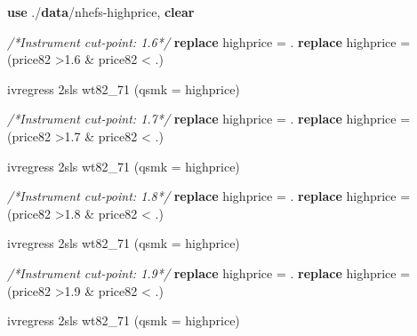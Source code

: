 \documentclass[
  10pt,
]{book}
\newenvironment{Shaded}{\begin{snugshade}}{\end{snugshade}}
\newcommand{\CommentTok}[1]{\textcolor[rgb]{0.56,0.35,0.01}{\textit{#1}}}
\newcommand{\KeywordTok}[1]{\textcolor[rgb]{0.13,0.29,0.53}{\textbf{#1}}}
\newcommand{\NormalTok}[1]{#1}
\begin{document}
\begin{Shaded}
\begin{Highlighting}[]
\KeywordTok{use}\NormalTok{ ./}\KeywordTok{data}\NormalTok{/nhefs-highprice, }\KeywordTok{clear}

\CommentTok{/*Instrument cut-point: 1.6*/}
\KeywordTok{replace}\NormalTok{ highprice = .}
\KeywordTok{replace}\NormalTok{ highprice = (price82 >1.6 & price82 < .)}

\NormalTok{ivregress 2sls wt82_71 (qsmk = highprice)}

\CommentTok{/*Instrument cut-point: 1.7*/}
\KeywordTok{replace}\NormalTok{ highprice = .}
\KeywordTok{replace}\NormalTok{ highprice = (price82 >1.7 & price82 < .)}

\NormalTok{ivregress 2sls wt82_71 (qsmk = highprice)}

\CommentTok{/*Instrument cut-point: 1.8*/}
\KeywordTok{replace}\NormalTok{ highprice = .}
\KeywordTok{replace}\NormalTok{ highprice = (price82 >1.8 & price82 < .)}

\NormalTok{ivregress 2sls wt82_71 (qsmk = highprice)}

\CommentTok{/*Instrument cut-point: 1.9*/}
\KeywordTok{replace}\NormalTok{ highprice = .}
\KeywordTok{replace}\NormalTok{ highprice = (price82 >1.9 & price82 < .)}

\NormalTok{ivregress 2sls wt82_71 (qsmk = highprice)}
\end{Highlighting}
\end{Shaded}
\end{document}
